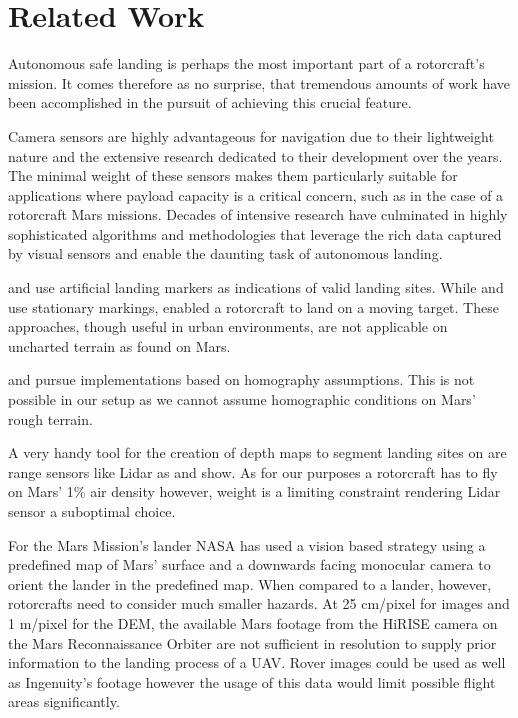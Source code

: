 \chapter{Related Work}
\label{sec:relwork}

Autonomous safe landing is perhaps the most important part of a rotorcraft's mission. It comes therefore as no surprise, that tremendous amounts of work have been accomplished in the pursuit of achieving this crucial feature. 

Camera sensors are highly advantageous for navigation due to their lightweight nature and the extensive research dedicated to their development over the years. The minimal weight of these sensors makes them particularly suitable for applications where payload capacity is a critical concern, such as in the case of a rotorcraft Mars missions. Decades of intensive research have culminated in highly sophisticated algorithms and methodologies that leverage the rich data captured by visual sensors and enable the daunting task of autonomous landing.

\citep{Saripalli2002VisionBasedLanding,Falanga2017QuadrotorLanding} and \citep{Mu2023VisionBasedLanding} use artificial landing markers as indications of valid landing sites. While \citep{Saripalli2002VisionBasedLanding} and \citep{Mu2023VisionBasedLanding} use stationary markings, \citep{Falanga2017QuadrotorLanding} enabled a rotorcraft to land on a moving target. These approaches,  though useful in urban environments,  are not applicable on uncharted terrain as found on Mars.

\citep{Bosch2006AutonomousDetection,Brockers2011AutonomousLanding,Desaraju2015VisionBased} and \citep{Brockers2014TowardsAutonomous} pursue implementations based on homography assumptions. This is not possible in our setup as we cannot assume homographic conditions on Mars' rough terrain. %

A very handy tool for the creation of depth maps to segment landing sites on are range sensors like Lidar as \citep{Trawny2015FlightTesting, Luna2017Evaluation, Johnson2002LidarBased} and \citep{Scherer2012AutonomousLanding} show. As for our purposes a rotorcraft has to fly on Mars' 1\% air density however, weight is a limiting constraint rendering Lidar sensor a suboptimal choice.

For the Mars Mission's lander NASA has used a vision based strategy using a predefined map of Mars' surface and a downwards facing monocular camera to orient the lander in the predefined map\citep{Johnson2020Mars2020}. When compared to a lander, however, rotorcrafts need to consider much smaller hazards. At 25 cm/pixel for images and 1 m/pixel for the DEM, the available Mars footage from the HiRISE camera on the Mars Reconnaissance Orbiter are not sufficient in resolution to supply prior information to the landing process of a UAV. Rover images could be used as well as Ingenuity's footage however the usage of this data would limit possible flight areas significantly.

